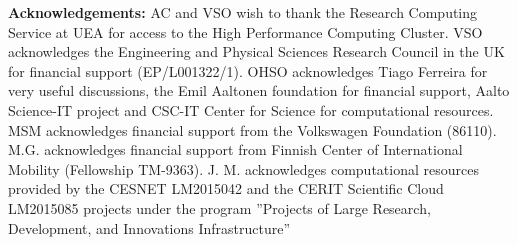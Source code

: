 \documentclass[twoside,twocolumn,9pt]{article}
\begin{document}
{\bf Acknowledgements: }
AC and VSO wish to thank the Research Computing Service at UEA for access to the High Performance Computing Cluster. VSO acknowledges the Engineering and Physical Sciences Research Council in the UK for financial support (EP/L001322/1).
%
OHSO acknowledges Tiago Ferreira for very useful discussions, the Emil Aaltonen foundation for financial support, Aalto Science-IT project and CSC-IT Center for Science for computational resources. 
%
MSM acknowledges financial support from the Volkswagen Foundation (86110).
%
M.G. acknowledges financial support from Finnish Center of International Mobility (Fellowship TM-9363).
%
J. M. acknowledges computational resources provided by the CESNET LM2015042 and the CERIT Scientific Cloud LM2015085 projects under the program ''Projects of Large Research, Development, and Innovations Infrastructure''


\end{document}
